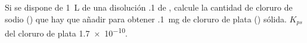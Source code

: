 Si se dispone de \SI{1}{\liter} de una disolución \SI{,1}{\Molar} de , calcule la cantidad de cloruro de sodio () que hay que añadir para obtener \SI{,1}{\milli\gram} de cloruro de plata () sólida. $K_{ps}$ del cloruro de plata \num{1,7e-10}.
